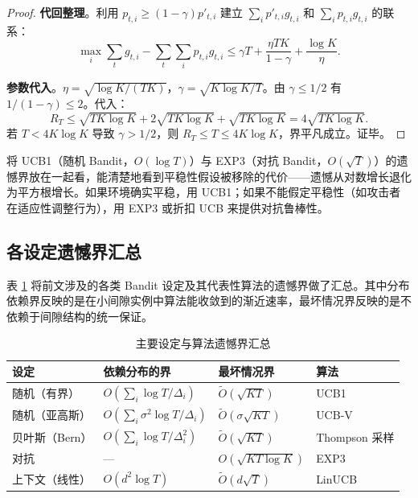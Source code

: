 \documentclass[UTF8,a4paper,11pt,zihao=5]{ctexart}
\newcommand{\regret}[1]{R_{#1}}
\begin{document}
\begin{proof}
\textbf{代回整理}。利用 $p_{t,i} \ge (1-\gamma)p'_{t,i}$ 建立 $\sum_i p'_{t,i} g_{t,i}$ 和 $\sum_i p_{t,i} g_{t,i}$ 的联系：
\begin{equation}
    \max_i \sum_t g_{t,i} - \sum_t\sum_i p_{t,i} g_{t,i}
    \le \gamma T + \frac{\eta T K}{1-\gamma} + \frac{\log K}{\eta}.
\end{equation}

\textbf{参数代入}。$\eta = \sqrt{\log K/(TK)}$，$\gamma = \sqrt{K\log K/T}$。由 $\gamma \le 1/2$ 有 $1/(1-\gamma) \le 2$。代入：
\begin{equation}
    \regret{T} \le \sqrt{TK\log K} + 2\sqrt{TK\log K} + \sqrt{TK\log K} = 4\sqrt{TK\log K}.
\end{equation}
若 $T < 4K\log K$ 导致 $\gamma > 1/2$，则 $\regret{T} \le T \le 4K\log K$，界平凡成立。证毕。
\end{proof}

将 UCB1（随机 Bandit，$O(\log T)$）与 EXP3（对抗 Bandit，$O(\sqrt{T})$）的遗憾界放在一起看，能清楚地看到平稳性假设被移除的代价——遗憾从对数增长退化为平方根增长。如果环境确实平稳，用 UCB1；如果不能假定平稳性（如攻击者在适应性调整行为），用 EXP3 或折扣 UCB 来提供对抗鲁棒性。

\subsection{各设定遗憾界汇总}

表 \ref{tab:summary} 将前文涉及的各类 Bandit 设定及其代表性算法的遗憾界做了汇总。其中分布依赖界反映的是在小间隙实例中算法能收敛到的渐近速率，最坏情况界反映的是不依赖于间隙结构的统一保证。

\begin{table}[htbp]
\centering
\caption{主要设定与算法遗憾界汇总}
\label{tab:summary}
\begin{tabular}{@{}llll@{}}
\toprule
\textbf{设定} & \textbf{依赖分布的界} & \textbf{最坏情况界} & \textbf{算法} \\
\midrule
随机（有界）  & $O(\sum_i \log T / \Delta_i)$  & $\tilde{O}(\sqrt{KT})$  & UCB1 \\
随机（亚高斯）& $O(\sum_i \sigma^2\log T/\Delta_i)$ & $\tilde{O}(\sigma\sqrt{KT})$ & UCB-V \\
贝叶斯（Bern）& $O(\sum_i \log T / \Delta_i^2)$& $\tilde{O}(\sqrt{KT})$  & Thompson 采样 \\
对抗          & ---                          & $O(\sqrt{KT\log K})$    & EXP3 \\
上下文（线性）& $O(d^2\log T)$               & $\tilde{O}(d\sqrt{T})$  & LinUCB \\
\bottomrule
\end{tabular}
\end{table}
\end{document}
